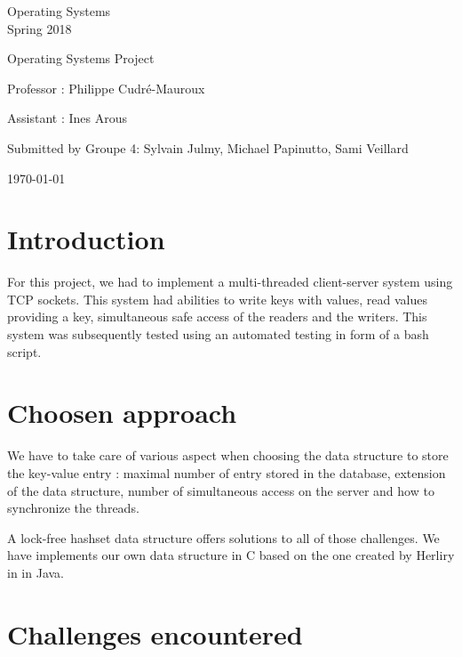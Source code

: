 \documentclass[a4paper,11pt]{report}
\begin{document}
\begin{center}
  \Large{
    Operating Systems\\
    Spring 2018
  }
  
  \noindent\makebox[\linewidth]{\rule{\linewidth}{0.4pt}}
  Operating Systems Project
  \noindent\makebox[\linewidth]{\rule{\linewidth}{0.4pt}}

  \begin{flushleft}
    Professor : Philippe Cudré-Mauroux

    Assistant : Ines Arous
  \end{flushleft}
  
  \noindent\makebox[\linewidth]{\rule{\linewidth}{0.4pt}}

  Submitted by Groupe 4: Sylvain Julmy, Michael Papinutto, Sami Veillard
  
  \noindent\makebox[\linewidth]{\rule{\textwidth}{1pt}}
  \vspace*{0.8cm}
  \today

\end{center}

\newpage

\section*{Introduction}
For this project, we had to implement a multi-threaded client-server system using TCP sockets.
This system had abilities to write keys with values, read values providing a key, simultaneous safe access of the readers and the writers.
This system was subsequently tested using an automated testing in form of a bash script.

\section*{Choosen approach}

We have to take care of various aspect when choosing the data structure to
store the key-value entry : maximal number of entry stored in the database,
extension of the data structure, number of simultaneous access on the server and
how to synchronize the threads.

A lock-free hashset data structure offers solutions to all of those challenges.
We have implements our own data structure in C based on the one created by
Herliry in \cite{Herlihy2006} in Java.

\section*{Challenges encountered}
\end{document}
